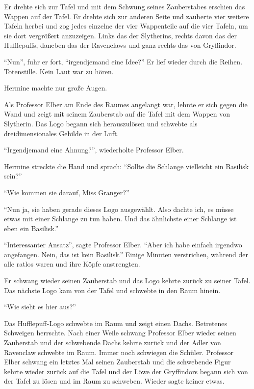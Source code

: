 Er drehte sich zur Tafel und mit dem Schwung seines Zauberstabes erschien das Wappen auf der Tafel. Er drehte sich zur anderen Seite und zauberte vier weitere Tafeln herbei und zog jedes einzelne der vier Wappenteile auf die vier Tafeln, um sie dort vergrößert anzuzeigen. Links das der Slytherins, rechts davon das der Hufflepuffs, daneben das der Ravenclaws und ganz rechts das von Gryffindor.

\enquote{Nun}, fuhr er fort, \enquote{irgendjemand eine Idee?} Er lief wieder durch die Reihen. Totenstille. Kein Laut war zu hören.

Hermine machte nur große Augen. 

Als Professor Elber am Ende des Raumes angelangt war, lehnte er sich gegen die Wand und zeigt mit seinem Zauberstab auf die Tafel mit dem Wappen von Slytherin. Das Logo begann sich herauszulösen und schwebte als dreidimensionales Gebilde in der Luft.

\enquote{Irgendjemand eine Ahnung?}, wiederholte Professor Elber.

Hermine streckte die Hand und sprach: \enquote{Sollte die Schlange vielleicht ein Basilisk sein?}

\enquote{Wie kommen sie darauf, Miss Granger?}

\enquote{Nun ja, sie haben gerade dieses Logo ausgewählt. Also dachte ich, es müsse etwas mit einer Schlange zu tun haben. Und das ähnlichste einer Schlange ist eben ein Basilisk.}

\enquote{Interessanter Ansatz}, sagte Professor Elber. \enquote{Aber ich habe einfach irgendwo angefangen. \gst Nein, das ist kein Basilisk.} Einige Minuten verstrichen, während der alle ratlos waren und ihre Köpfe anstrengten.

Er schwang wieder seinen Zauberstab und das Logo kehrte zurück zu seiner Tafel. Das nächste Logo kam von der Tafel und schwebte in den Raum hinein.

\enquote{Wie sieht es hier aus?}

Das Hufflepuff-Logo schwebte im Raum und zeigt einen Dachs. Betretenes Schweigen herrschte. Nach einer Weile schwang Professor Elber wieder seinen Zauberstab und der schwebende Dachs kehrte zurück und der Adler von Ravenclaw schwebte im Raum. Immer noch schwiegen die Schüler. Professor Elber schwang ein letztes Mal seinen Zauberstab und die schwebende Figur kehrte wieder zurück auf die Tafel und der Löwe der Gryffindors begann sich von der Tafel zu lösen und im Raum zu schweben. Wieder sagte keiner etwas.

